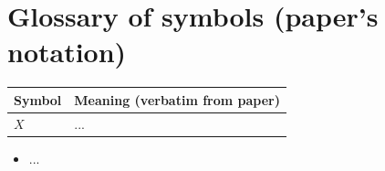 \documentclass[11pt,a4paper]{article}
\begin{document}
\section{Glossary of symbols (paper's notation)}
\begin{tabular}{@{}p{3cm}p{12cm}@{}}
\toprule
Symbol & Meaning (verbatim from paper) \\
\midrule
$X$ & ... \\
\bottomrule
\end{tabular}

\begin{todobox}
\begin{itemize}[noitemsep]
  \item ...
\end{itemize}
\end{todobox}
\end{document}
